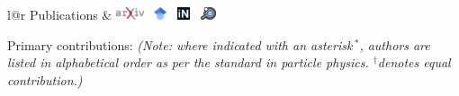 \documentclass[letterpaper,11pt]{article}
\newcommand{\arxivlogo}{\includegraphics[height=1em]{figures/arxiv-logo.pdf}}
\newcommand{\inspirelogo}{\includegraphics[height=1em]{figures/inspire-logo.pdf}}
\newcommand{\adslogo}{\includegraphics[height=1em]{figures/ads-logo.pdf}}
\newcommand{\scholarlogo}{\includegraphics[height=1em]{figures/gscholar-logo.pdf}}
\begin{document}


\noindent
\begin{tabular*}{\textwidth}{l@{\extracolsep{\fill}}r}
\large {\sc \Large{Publications}} & 
\href{https://arxiv.org/a/mishrasharma_s_1.html}{\arxivlogo}  \
\href{https://scholar.google.com/citations?hl=en&user=hJVjhlwAAAAJ&view_op=list_works&sortby=pubdate}{\scholarlogo}  \ 
\href{https://inspirehep.net/authors/1394493}{\inspirelogo}  \ 
\href{https://ui.adsabs.harvard.edu/search/p_=0&q=author%3A%22Mishra-Sharma%2C%20Siddharth%22&sort=date%20desc%2C%20bibcode%20desc}{\adslogo} \\
\hline
\end{tabular*}\vspace{3.5mm}

\noindent
Primary contributions: \emph{(Note: where indicated with an asterisk\,$^*$, authors are listed in alphabetical order as per the standard in particle physics. $^{\dagger}$denotes equal contribution.)}
\end{document}
